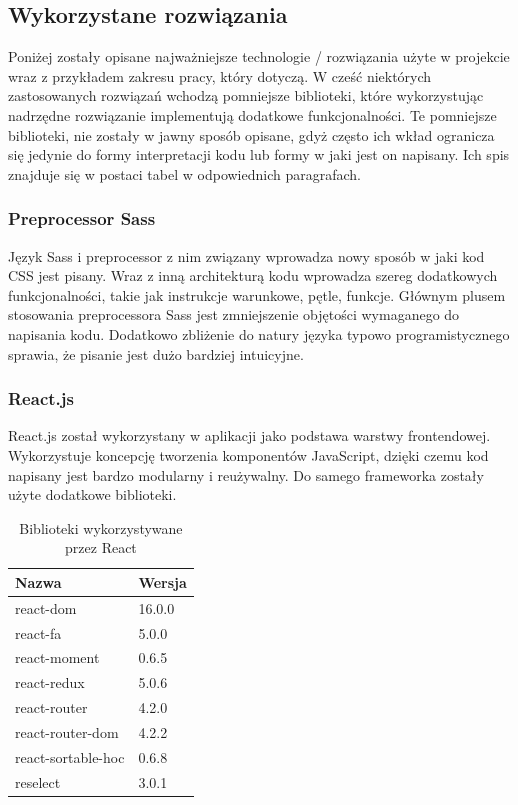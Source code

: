 \documentclass[eng,printmode]{mgr}
\begin{document}
\subsection{Wykorzystane rozwiązania}

Poniżej zostały opisane najważniejsze technologie / rozwiązania użyte w projekcie wraz z przykładem zakresu pracy, który dotyczą. W cześć niektórych zastosowanych rozwiązań wchodzą pomniejsze biblioteki, które wykorzystując nadrzędne rozwiązanie implementują dodatkowe funkcjonalności. Te pomniejsze biblioteki, nie zostały w jawny sposób opisane, gdyż często ich wkład ogranicza się jedynie do formy interpretacji kodu lub formy w jaki jest on napisany. Ich spis znajduje się w postaci tabel w odpowiednich paragrafach.

\subsubsection{Preprocessor Sass}
Język Sass i preprocessor z nim związany \cite{Sass} wprowadza nowy sposób w jaki kod CSS jest pisany. Wraz z inną architekturą kodu wprowadza szereg dodatkowych funkcjonalności, takie jak instrukcje warunkowe, pętle, funkcje. Głównym plusem stosowania preprocessora Sass jest zmniejszenie objętości wymaganego do napisania kodu. Dodatkowo zbliżenie do natury języka typowo programistycznego sprawia, że pisanie jest dużo bardziej intuicyjne.

\subsubsection{React.js}
React.js \cite{React} został wykorzystany w aplikacji jako podstawa warstwy frontendowej. Wykorzystuje koncepcję tworzenia komponentów JavaScript, dzięki czemu kod napisany jest bardzo modularny i reużywalny. Do samego frameworka zostały użyte dodatkowe biblioteki.

\begin{table}[H]
\begin{tabularx}{\textwidth}{|X|X|}
  \hline
    \textbf{Nazwa} & \textbf{Wersja} \\
  \hline
   	react-dom & 16.0.0 \\
  \hline
  	react-fa & 5.0.0 \\
   \hline
   	react-moment & 0.6.5 \\
   \hline
  	react-redux & 5.0.6 \\
   \hline
  	react-router & 4.2.0 \\
   \hline
  	react-router-dom & 4.2.2 \\
   \hline
  	react-sortable-hoc & 0.6.8 \\
   \hline
   reselect & 3.0.1 \\
   \hline
\end{tabularx}
\caption{Biblioteki wykorzystywane przez React}
\end{table}
\end{document}
